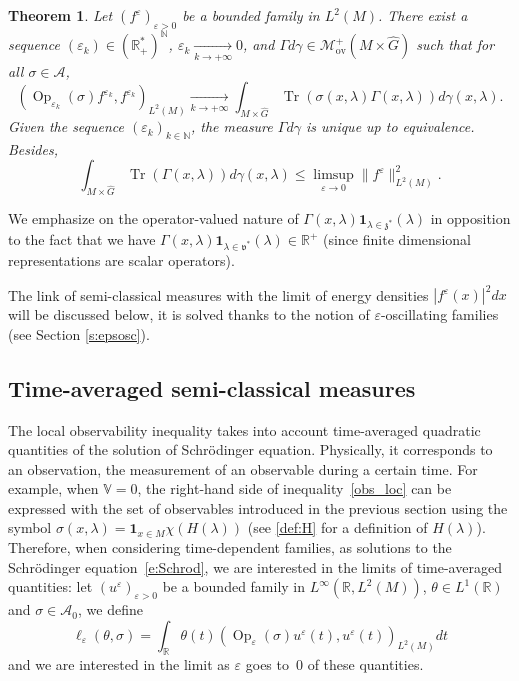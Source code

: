 \documentclass[JEP,XML,SOM,Unicode,published]{cedram}
\let\mathcal\mathscr
\newcommand{\rov}{\mathrm{ov}}
\newcommand{\bun}{\mathbf{1}}
\DeclareMathOperator{\Op}{Op}
\DeclareMathOperator{\Tr}{Tr}
\theoremstyle{plain}
\newtheorem{theorem}{Theorem}[section]
\theoremstyle{definition}
\let\eps\varepsilon
\def\R{{\mathbb R}}
\def\N{{\mathbb N}}
\def\bbV{{\mathbb V}}
\begin{document}
\begin{theorem}
Let $(f^\eps)_{\eps>0}$ be a bounded family in $L^2(M)$. There exist a sequence $(\eps_k)\in(\R_+^*)^{\N}$, $\eps_k \underset{k\to +\infty}{\longrightarrow} 0$, and $ \Gamma d\gamma\in \mathcal{M}_{\rov}^+(M\times \widehat{G})$ such that for all $\sigma\in\mathcal{A}$,
\begin{equation*}
(\Op_{\eps_k}(\sigma)f^{\eps_k},f^{\eps_k})_{L^2(M)} \underset{k\to +\infty}{\longrightarrow} \int_{M\times\widehat{G}} \Tr(\sigma(x,\lambda)\Gamma(x,\lambda))d\gamma(x,\lambda).
\end{equation*}
Given the sequence $(\eps_k)_{k\in\N}$, the measure $ \Gamma d\gamma$ is unique up to equivalence. Besides,
\begin{equation*}
\int_{M\times \widehat{G}}\Tr(\Gamma(x,\lambda))d\gamma(x,\lambda)\leq \limsup_{\eps\to 0}\|f^\eps\|^2_{L^2(M)}.
\end{equation*}
\end{theorem}

We emphasize on the operator-valued nature of $\Gamma (x,\lambda) \bun_{\lambda\in \mathfrak z^*}(\lambda)$ in opposition to the fact that we have
$\Gamma (x,\lambda) \bun_{\lambda\in \mathfrak v^*}(\lambda)\in \R^+$ (since finite dimensional representations are scalar operators).

The link of semi-classical measures with the limit of energy densities $|f^\eps(x)|^2 dx$ will be discussed below, it is solved thanks to the notion of $\eps$-oscillating families (see Section \ref{s:epsosc}).

\subsection{Time-averaged semi-classical measures}
\label{s:sclmeastime}
The local observability inequality takes into account time-averaged quadratic quantities of the solution of Schrödinger equation. Physically, it corresponds to an observation, \ie the measurement of an observable during a certain time. For example, when $\bbV=0$, the right-hand side of inequality~\eqref{obs_loc} can be expressed with the set of observables introduced in the previous section using the symbol $\sigma(x,\lambda)= \bun_{x\in M} \chi (H(\lambda))$ (see \eqref{def:H} for a definition of $H(\lambda)$). Therefore, when considering time-dependent families, as solutions to the Schrödinger equation~\eqref{e:Schrod}, we are interested in the limits of time-averaged quantities: let $(u^\eps)_{\eps>0}$ be a bounded family in $L^\infty(\R,L^2(M))$, $\theta\in L^1(\R)$ and $\sigma\in {{\mathcal A}_0}$, we define
\[
\ell_\eps(\theta, \sigma) = \int_{\R} \theta(t) \left(\Op_\eps(\sigma) u^\eps(t),u^\eps(t)\right) _{L^2(M)} dt
\]
and we are interested in the limit as $\eps$ goes to~$0$ of these quantities.
\end{document}
